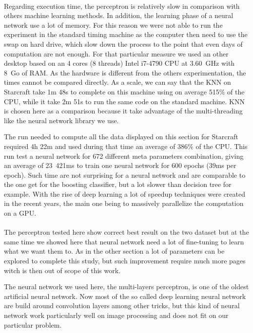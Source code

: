 \documentclass[twocolumn,a4paper,10pt]{article}
\begin{document}
\paragraph{}
Regarding execution time, the perceptron is relatively slow in comparison with others machine learning methods. In addition, the learning phase of a neural network use a lot of memory. For this reason we were not able to run the experiment in the standard timing machine as the computer then need to use the swap on hard drive, which slow down the process to the point that even days of computation are not enough. For that particular measure we used an other desktop based on an 4 cores (8 threads) Intel i7-4790 CPU at 3.60~GHz with 8~Go of RAM. As the hardware is different from the others experimentation, the times cannot be compared directly. As a scale, we can say that the KNN on Starcraft take 1m 48s to complete on this machine using on average 515\% of the CPU, while it take 2m 51s to run the same code on the standard machine. KNN is chosen here as a comparison because it take advantage of the multi-threading like the neural network library we use.

The run needed to compute all the data displayed on this section for Starcraft required 4h 22m and used during that time an average of 386\% of the CPU. This run test a neural network for 672 different meta parameters combination, giving an average of 23~421ms to train one neural network for 600 epochs (39ms per epoch). Such time are not surprising for a neural network and are comparable to the one get for the boosting classifier, but a lot slower than decision tree for example. With the rise of deep learning a lot of speedup techniques were created in the recent years, the main one being to massively parallelize the computation on a GPU.

\paragraph{}
The perceptron tested here show correct best result on the two dataset
but at the same time we showed here that neural network need a lot
of fine-tuning to learn what we want them to. As in the other section
a lot of parameters can be explored to complete this study, but such
improvement require much more pages witch is then out of scope of
this work.

The neural network we used here, the multi-layers perceptron, is one
of the oldest artificial neural network. Now most of the so called
deep learning neural network are build around convolution layers among
other tricks, but this kind of neural network work particularly well
on image processing and does not fit on our particular problem. %
\end{document}
